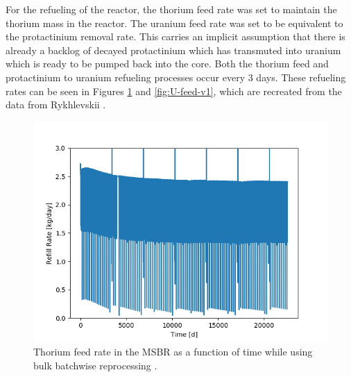 For the refueling of the reactor, the thorium feed rate was set to maintain the thorium mass in the reactor. The uranium feed rate was set to be equivalent to the protactinium removal rate. This carries an implicit assumption that there is already a backlog of decayed protactinium which has transmuted into uranium which is ready to be pumped back into the core. Both the thorium feed and protactinium to uranium refueling processes occur every 3 days. These refueling rates can be seen in Figures \ref{fig:Th-feed-v1} and \ref{fig:U-feed-v1}, which are recreated from the data from Rykhlevskii \cite{rykhlevskii_advanced_2018}.


\begin{figure}[H]
  \centering
  \includegraphics[scale=0.5]{images/Th232rem_massv01.png}
  \caption{Thorium feed rate in the MSBR as a function of time while using bulk batchwise reprocessing \cite{rykhlevskii_advanced_2018}.}
   \label{fig:Th-feed-v1}
\end{figure}

